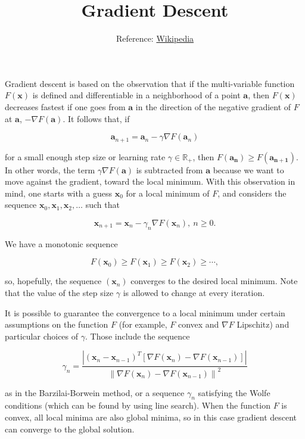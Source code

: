 
\title{Gradient Descent}

\author{Reference: \href{https://en.wikipedia.org/wiki/Gradient_descent}{Wikipedia}}






\maketitle


Gradient descent is based on the observation that if the multi-variable function $F(\mathbf{x})$ is defined and differentiable in a 
neighborhood of a point $\mathbf{a}$, then $F(\mathbf{x})$ decreases fastest if one goes from $\mathbf{a}$ in the direction of the 
negative gradient of $F$ at $\mathbf{a}$, $-\nabla F(\mathbf{a})$. It follows that, if

\[
\mathbf{a}_{n+1} = \mathbf{a}_n-\gamma\nabla F(\mathbf{a}_n)
\]

for a small enough step size or learning rate $\gamma \in \mathbb{R}_{+}$, then $F(\mathbf{a_n})\geq F(\mathbf{a_{n+1}})$. 
In other words, the term $\gamma\nabla F(\mathbf{a})$ is subtracted from $\mathbf{a}$ because we want to move against the gradient, 
toward the local minimum. With this observation in mind, one starts with a guess $\mathbf{x}_0$ for a local minimum of $F$, and 
considers the sequence $\mathbf{x}_0, \mathbf{x}_1, \mathbf{x}_2, \ldots$ such that

\[
\mathbf{x}_{n+1}=\mathbf{x}_n-\gamma_n \nabla F(\mathbf{x}_n),\ n \ge 0.
\]

We have a monotonic sequence

\[
F(\mathbf{x}_0)\ge F(\mathbf{x}_1)\ge F(\mathbf{x}_2)\ge \cdots,
\]

so, hopefully, the sequence $(\mathbf{x}_n)$ converges to the desired local minimum. Note that the value of the step 
size $\gamma$ is allowed to change at every iteration. 

It is possible to guarantee the convergence to a local minimum under certain assumptions 
on the function $F$ (for example, $F$ convex and $\nabla F$ Lipschitz) and particular choices of $\gamma$. 
Those include the sequence

\[
\gamma_{n} = \frac{ \left | \left (\mathbf x_{n} - \mathbf x_{n-1} \right )^T \left [\nabla F (\mathbf x_{n}) - \nabla F (\mathbf x_{n-1}) \right ] \right |}{\left \|\nabla F(\mathbf{x}_{n}) - \nabla F(\mathbf{x}_{n-1}) \right \|^2}
\]

as in the Barzilai-Borwein method, or a sequence $\gamma_n$ satisfying the Wolfe conditions (which can be found by using line search). 
When the function $F$ is convex, all local minima are also global minima, so in this case gradient descent can converge to the 
global solution.

